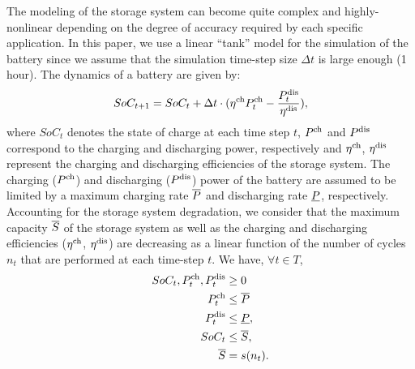 \documentclass{article}
\begin{document}
    The modeling of the storage system can become quite complex and highly-nonlinear depending on the degree of accuracy required by each specific application. In this paper, we use a linear ``tank'' model for the simulation of the battery since we assume that the simulation time-step size $\Delta t$ is large enough (1 hour). The dynamics of a battery are given by:
    \begin{gather}
    SoC_{t+1} = SoC_{t}+ \Delta t\cdot(\eta^{\text{ch}} P^{\text{ch}}_t - \frac{P^{\text{dis}}_t}{\eta^{\text{dis}}}) ,\label{eqn: storagedynamics}
    \end{gather}
    where $SoC_{t}$ denotes the state of charge at each time step $t$, $P^{\text{ch}}$ and $P^{\text{dis}}$ correspond to the charging and discharging power, respectively and $\eta^{\text{ch}}$, $\eta^{\text{dis}}$ represent the charging and discharging efficiencies of the storage system. The charging ($P^{\text{ch}}$) and discharging ($P^{\text{dis}}$) power of the battery are assumed to be limited by a maximum charging rate $\overline{P}$ and discharging rate $\underline{P}$, respectively. Accounting for the storage system degradation, we consider that the maximum capacity $\overline{S}$ of the storage system as well as the charging and discharging efficiencies ($\eta^{\text{ch}}$, $\eta^{\text{dis}}$) are decreasing as a linear function of the number of cycles $n_t$ that are performed at each time-step $t$. We have, $\forall t \in T$, 
    \begin{align}
    SoC_{t}, P^{\text{ch}}_t, P^{\text{dis}}_t &\geq 0 \\
    P^{\text{ch}}_t &\leq \overline{P}\\
    P^{\text{dis}}_t &\leq \underline{P} , \\
    SoC_{t} &\leq \overline{S} \label{eqn: storage limits},\\
    \overline{S}&=s(n_t). \label{eqn: storage_limits_evolving}
    \end{align}
    
\end{document}
